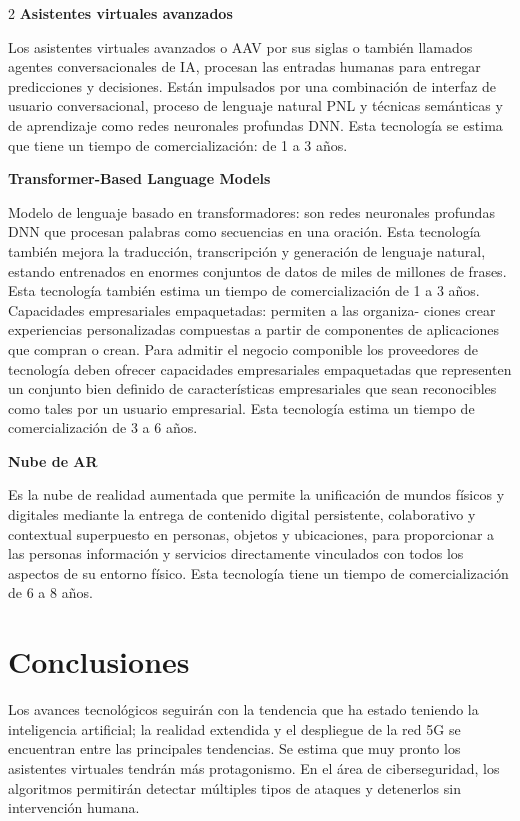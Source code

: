 \documentclass[12pt,spanish,Letterpaper,openany]{book}
\begin{document}
\begin {multicols}{2}
\textbf{Asistentes virtuales avanzados}

Los asistentes virtuales avanzados o AAV por sus siglas o también llamados agentes conversacionales de IA, procesan las entradas humanas para entregar predicciones y decisiones. Están impulsados por una combinación de interfaz de usuario conversacional, proceso de lenguaje natural PNL y técnicas semánticas y de aprendizaje como redes neuronales profundas DNN. Esta tecnología se estima que tiene un tiempo de comercialización: de 1 a 3 años.

\textbf{Transformer-Based Language Models}

Modelo de lenguaje basado en transformadores: son redes neuronales profundas DNN que procesan palabras como secuencias en una oración. Esta tecnología también mejora la traducción, transcripción y generación de lenguaje natural, estando entrenados en enormes conjuntos de datos de miles de millones de frases. Esta tecnología también estima un tiempo de comercialización de 1 a 3 años.
Capacidades empresariales empaquetadas: permiten a las organiza-
ciones crear experiencias personalizadas compuestas a partir de componentes de aplicaciones que compran o crean. Para admitir el negocio componible los proveedores de tecnología deben ofrecer capacidades empresariales empaquetadas que representen un conjunto bien definido de características empresariales que sean reconocibles como tales por un usuario empresarial. Esta tecnología estima un tiempo de comercialización de 3 a 6 años.

\textbf{Nube de AR}

Es la nube de realidad aumentada que permite la unificación de mundos físicos y digitales mediante la entrega de contenido digital persistente, colaborativo y contextual superpuesto en personas, objetos y ubicaciones, para proporcionar a las personas información y servicios directamente vinculados con todos los aspectos de su entorno físico. Esta tecnología tiene un tiempo de comercialización de 6 a 8 años.

\hypertarget{conclusiones-5}{%
\section{Conclusiones}\label{conclusiones-5}}

Los avances tecnológicos seguirán con la tendencia que ha estado teniendo la inteligencia artificial; la realidad extendida y el despliegue de la red 5G se encuentran entre las principales tendencias. Se estima que muy pronto los asistentes virtuales tendrán más protagonismo. En el área de ciberseguridad, los algoritmos permitirán detectar múltiples tipos de ataques y detenerlos sin intervención humana.


\end{multicols}
\end{document}
